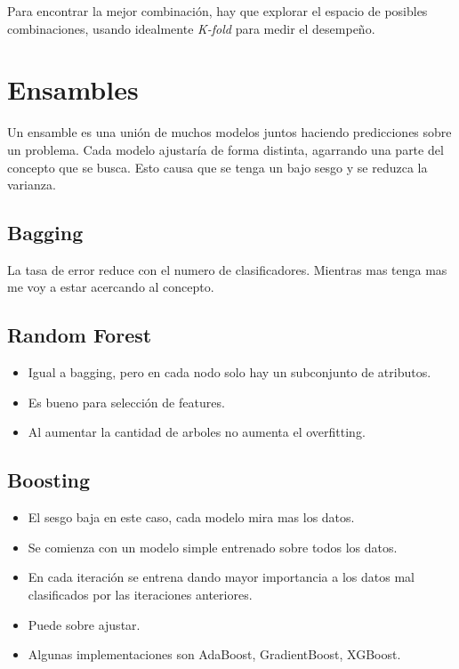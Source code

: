 \documentclass[titlepage,a4paper]{article}
\begin{document}
Para encontrar la mejor combinación, hay que explorar el espacio de posibles combinaciones, usando idealmente \textit{K-fold} para medir el desempeño.


\section{Ensambles}

Un ensamble es una unión de muchos modelos juntos haciendo predicciones sobre un problema. Cada modelo ajustaría de forma distinta, agarrando una parte del concepto que se busca. Esto causa que se tenga un bajo sesgo y se reduzca la varianza.


\subsection{Bagging}


La tasa de error reduce con el numero de clasificadores. Mientras mas tenga mas me voy a estar acercando al concepto.

\subsection{Random Forest}

\begin{itemize}
    \item Igual a bagging, pero en cada nodo solo hay un subconjunto de atributos.
    \item Es bueno para selección de features.
    \item Al aumentar la cantidad de arboles no aumenta el overfitting.
\end{itemize}


\subsection{Boosting}
\begin{itemize}
    \item El sesgo baja en este caso, cada modelo mira mas los datos.
    \item Se comienza con un modelo simple entrenado sobre todos los datos.
    \item En cada iteración se entrena dando mayor importancia a los datos mal clasificados por las iteraciones anteriores.
    \item Puede sobre ajustar.
    \item Algunas implementaciones son AdaBoost, GradientBoost, XGBoost.
\end{itemize}
\end{document}
